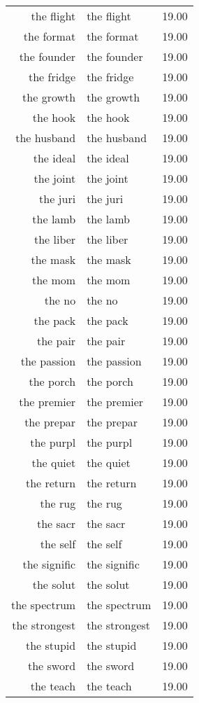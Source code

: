 \begin{table}[ht]
\begin{tabular}{rlr}
  the flight & the flight & 19.00 \\ 
  the format & the format & 19.00 \\ 
  the founder & the founder & 19.00 \\ 
  the fridge & the fridge & 19.00 \\ 
  the growth & the growth & 19.00 \\ 
  the hook & the hook & 19.00 \\ 
  the husband & the husband & 19.00 \\ 
  the ideal & the ideal & 19.00 \\ 
  the joint & the joint & 19.00 \\ 
  the juri & the juri & 19.00 \\ 
  the lamb & the lamb & 19.00 \\ 
  the liber & the liber & 19.00 \\ 
  the mask & the mask & 19.00 \\ 
  the mom & the mom & 19.00 \\ 
  the no & the no & 19.00 \\ 
  the pack & the pack & 19.00 \\ 
  the pair & the pair & 19.00 \\ 
  the passion & the passion & 19.00 \\ 
  the porch & the porch & 19.00 \\ 
  the premier & the premier & 19.00 \\ 
  the prepar & the prepar & 19.00 \\ 
  the purpl & the purpl & 19.00 \\ 
  the quiet & the quiet & 19.00 \\ 
  the return & the return & 19.00 \\ 
  the rug & the rug & 19.00 \\ 
  the sacr & the sacr & 19.00 \\ 
  the self & the self & 19.00 \\ 
  the signific & the signific & 19.00 \\ 
  the solut & the solut & 19.00 \\ 
  the spectrum & the spectrum & 19.00 \\ 
  the strongest & the strongest & 19.00 \\ 
  the stupid & the stupid & 19.00 \\ 
  the sword & the sword & 19.00 \\ 
  the teach & the teach & 19.00 \\ 

\end{tabular}
\end{table}

